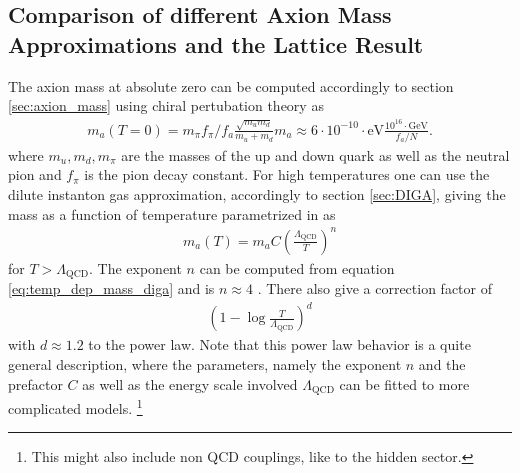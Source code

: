 \documentclass[a4paper, 12pt]{article}
\begin{document}
\subsection{Comparison of different Axion Mass Approximations and the Lattice Result}
The axion mass at absolute zero can be computed accordingly to section \ref{sec:axion_mass} using chiral pertubation theory \cite[Sec III, Page 7, Eq. 15]{AxionCosmoRev} as
\begin{align}
    \label{eq:m_a_T0}
    m_a(T = 0) = m_\pi f_\pi / f_a \frac{\sqrt{m_u m_d}}{m_u + m_d} m_a \approx 6 \cdot 10^{-10} \cdot \mathrm{eV} \frac{10^{16} \cdot \mathrm{GeV}}{f_a / N}.
\end{align}
where $m_u, m_d, m_\pi$ are the masses of the up and down quark as well as the neutral pion and
$f_\pi$ is the pion decay constant.
For high temperatures one can use the dilute instanton gas approximation, accordingly to section \ref{sec:DIGA}, giving
the mass as a function of temperature parametrized in \cite[Sec. 2.1]{Fox:2004kb} as
\begin{align}
    \label{eq:axion_mass1}
    m_a(T) = m_a C \left( \frac{\Lambda_\mathrm{QCD}}{T} \right)^{n}
\end{align}
for $T > \Lambda_\mathrm{QCD}$.
The exponent $n$ can be computed from equation \ref{eq:temp_dep_mass_diga} and is $n \approx 4$ \cite[Appendix B]{Fox:2004kb}.
There also give a correction factor of
\begin{align}
    \left( 1 - \log \frac{T}{\Lambda_\mathrm{QCD}}\right)^d
\end{align}
with $d \approx 1.2$ to the power law.
Note that this power law behavior is a quite general description, where the parameters, namely the
exponent $n$ and the prefactor $C$ as well as the energy scale involved $\Lambda_\mathrm{QCD}$
can be fitted to more complicated models. \footnote{This might also include non QCD couplings, like to
the hidden sector.}
\end{document}
